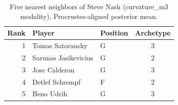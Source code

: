 \begin{table}[htbp]
  \centering\small
  \begin{tabular}{rllc}
    \toprule
    Rank & Player & Position & Archetype \\
    \midrule
    1 & Tomas Satoransky & G & 3 \\
    2 & Sarunas Jasikevicius & G & 2 \\
    3 & Jose Calderon & G & 3 \\
    4 & Detlef Schrempf & F & 2 \\
    5 & Beno Udrih & G & 3 \\
    \bottomrule
  \end{tabular}
  \caption{Five nearest neighbors of Steve Nash (curvature_m3 modality), Procrustes-aligned posterior mean.}
  \label{tab:Steve_Nash_neighbors_curvature_m3}
\end{table}

